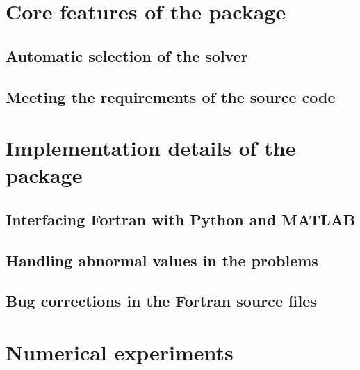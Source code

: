 \section{Core features of the  package}

\subsection{Automatic selection of the solver}

\subsection{Meeting the requirements of the source code}

\section{Implementation details of the  package}

\subsection{Interfacing Fortran with Python and MATLAB}

\subsection{Handling abnormal values in the problems}

\subsection{Bug corrections in the Fortran source files}

\section{Numerical experiments}
